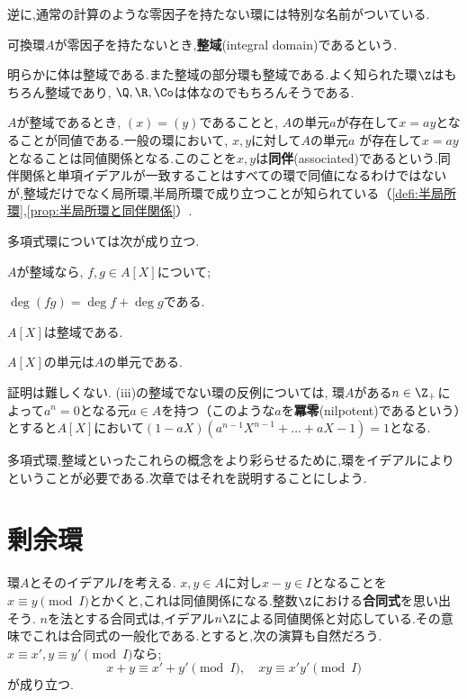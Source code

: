 逆に,通常の計算のような零因子を持たない環には特別な名前がついている.

\begin{defi}[整域]
	可換環$A$が零因子を持たないとき,\textbf{整域}(integral domain)であるという.
\end{defi}

明らかに体は整域である.また整域の部分環も整域である.よく知られた環$\Z$はもちろん整域であり, $\Q,\R,\Co$は体なのでもちろんそうである.

$A$が整域であるとき, $(x)=(y)$であることと, $A$の単元$a$が存在して$x=ay$となることが同値である.一般の環において, $x,y$に対して$A$の単元$a$
が存在して$x=ay$となることは同値関係となる.このことを$x,y$は\textbf{同伴}(associated)であるという.同伴関係と単項イデアルが一致することはすべての環で同値になるわけではないが,整域だけでなく局所環,半局所環で成り立つことが知られている（\ref{defi:半局所環},\ref{prop:半局所環と同伴関係}）.

多項式環については次が成り立つ.

\begin{prop}
	$A$が整域なら, $f,g\in A[X]$について;
	\begin{sakura}
		\item $\deg(fg)=\deg f+\deg g$である.
		\item $A[X]$は整域である.
		\item $A[X]$の単元は$A$の単元である.
	\end{sakura}
\end{prop}

証明は難しくない. (iii)の整域でない環の反例については, 環$A$がある$n\in\Z_+$によって$a^n=0$となる元$a\in A$を持つ（このような$a$を\textbf{冪零}(nilpotent)であるという）とすると$A[X]$において$(1-aX)(a^{n-1}X^{n-1}+\dots+aX-1)=1$となる.

多項式環,整域といったこれらの概念をより彩らせるために,環をイデアルによりということが必要である.次章ではそれを説明することにしよう.

\section{剰余環}

環$A$とそのイデアル$I$を考える. $x,y\in A$に対し$x-y\in I$となることを$x\equiv y \pmod I$とかくと,これは同値関係になる.整数$\Z$における\textbf{合同式}を思い出そう. $n$を法とする合同式は,イデアル$n\Z$による同値関係と対応している.その意味でこれは合同式の一般化である.とすると,次の演算も自然だろう. $x\equiv x',y\equiv y'\pmod I$なら;
\[x+y\equiv x'+y'\pmod I,\quad xy\equiv x'y'\pmod I\]
が成り立つ.

